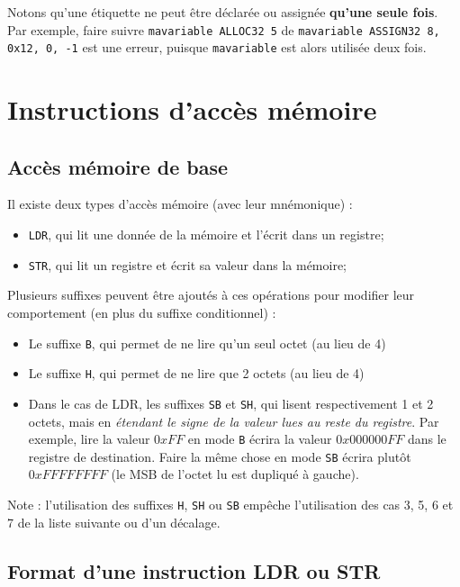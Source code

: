 \documentclass{tufte-handout}
\begin{document}
Notons qu'une étiquette ne peut être déclarée ou assignée \textbf{qu'une seule fois}. Par exemple, faire suivre \texttt{mavariable ALLOC32 5} de \texttt{mavariable ASSIGN32 8, 0x12, 0, -1} est une erreur, puisque \texttt{mavariable} est alors utilisée deux fois.

\clearpage
\section{Instructions d'accès mémoire}
\vspace{-0.8em}
\subsection{Accès mémoire de base}

Il existe deux types d'accès mémoire (avec leur mnémonique) :
\begin{itemize}
	\item \texttt{LDR}, qui lit une donnée de la mémoire et l'écrit dans un registre;
	\item \texttt{STR}, qui lit un registre et écrit sa valeur dans la mémoire;
\end{itemize}

Plusieurs suffixes peuvent être ajoutés à ces opérations pour modifier leur comportement (en plus du suffixe conditionnel) :
\begin{itemize}
	\item Le suffixe \texttt{B}, qui permet de ne lire qu'un seul octet (au lieu de 4)
	\item Le suffixe \texttt{H}, qui permet de ne lire que 2 octets (au lieu de 4)
	\item Dans le cas de LDR, les suffixes \texttt{SB} et \texttt{SH}, qui lisent respectivement 1 et 2 octets, mais en \textit{étendant le signe de la valeur lues au reste du registre}. Par exemple, lire la valeur $0xFF$ en mode \texttt{B} écrira la valeur $0x000000FF$ dans le registre de destination. Faire la même chose en mode \texttt{SB} écrira plutôt $0xFFFFFFFF$ (le MSB de l'octet lu est dupliqué à gauche).
\end{itemize}
Note : l'utilisation des suffixes \texttt{H}, \texttt{SH} ou \texttt{SB} empêche l'utilisation des cas 3, 5, 6 et 7 de la liste suivante ou d'un décalage.

\subsection{Format d'une instruction LDR ou STR}
\end{document}
